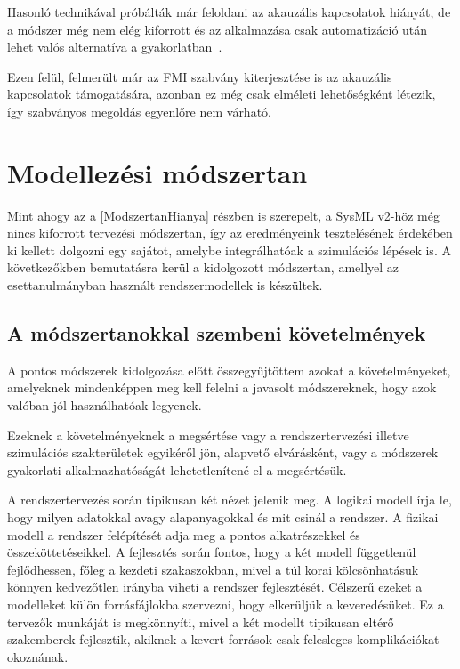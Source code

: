         Hasonló technikával próbálták már feloldani az akauzális kapcsolatok hiányát, de a módszer még nem elég kiforrott és az alkalmazása csak automatizáció után lehet valós alternatíva a gyakorlatban~\cite{Hirano_2015, Fish2023}.
        
        Ezen felül, felmerült már az FMI szabvány kiterjesztése is az akauzális kapcsolatok támogatására, azonban ez még csak elméleti lehetőségként létezik, így szabványos megoldás egyenlőre nem várható.

\section{Modellezési módszertan}
Mint ahogy az a \ref{ModszertanHianya} részben is szerepelt, a SysML v2-höz még nincs kiforrott tervezési módszertan, így az eredményeink tesztelésének érdekében ki kellett dolgozni egy sajátot, amelybe integrálhatóak a szimulációs lépések is.
A következőkben bemutatásra kerül a kidolgozott módszertan, amellyel az esettanulmányban használt rendszermodellek is készültek.
    
    \subsection{A módszertanokkal szembeni követelmények} \label{ProblemsToSolve}
    A pontos módszerek kidolgozása előtt összegyűjtöttem azokat a követelményeket, amelyeknek mindenképpen meg kell felelni a javasolt módszereknek, hogy azok valóban jól használhatóak legyenek.

    Ezeknek a követelményeknek a megsértése vagy a rendszertervezési illetve szimulációs szakterületek egyikéről jön, alapvető elvárásként, vagy a módszerek gyakorlati alkalmazhatóságát lehetetlenítené el a megsértésük.

        \begin{req} \label{sec:LogFiz}
            A rendszertervezés során tipikusan két nézet jelenik meg. A logikai modell írja le, hogy milyen adatokkal avagy alapanyagokkal és mit csinál a rendszer.
            A fizikai modell a rendszer felépítését adja meg a pontos alkatrészekkel és összeköttetéseikkel.
            A fejlesztés során fontos, hogy a két modell függetlenül fejlődhessen, főleg a kezdeti szakaszokban, mivel a túl korai kölcsönhatásuk könnyen kedvezőtlen irányba viheti a rendszer fejlesztését.
            Célszerű ezeket a modelleket külön forrásfájlokba szervezni, hogy elkerüljük a keveredésüket.
            Ez a tervezők munkáját is megkönnyíti, mivel a két modellt tipikusan eltérő szakemberek fejlesztik, akiknek a kevert források csak felesleges komplikációkat okoznának.   
        \end{req}
        
